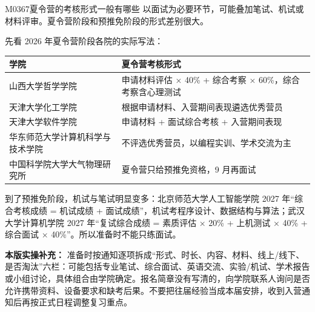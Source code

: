 \begin{qa}{M0367}{夏令营的考核形式一般有哪些}
以面试为必要环节，可能叠加笔试、机试或材料评审。夏令营阶段和预推免阶段的形式差别很大。

先看 2026 年夏令营阶段各院的实际写法：
\par\vspace{2pt}\nobreak\begin{center}\footnotesize
\begin{tabularx}{\textwidth}{>{\raggedright\arraybackslash}X>{\raggedright\arraybackslash}X}
\toprule
\textbf{学院} & \textbf{夏令营考核形式} \\ \midrule
山西大学哲学学院 & 申请材料评估 × 40\% + 综合考察 × 60\%，综合考察含心理测试 \\
天津大学化工学院 & 根据申请材料、入营期间表现遴选优秀营员 \\
天津大学软件学院 & 申请材料 + 面试综合考核 + 入营期间表现 \\
华东师范大学计算机科学与技术学院 & 不评选优秀营员，以编程实训、学术交流为主 \\
中国科学院大学大气物理研究所 & 夏令营只给预推免资格，9 月再面试 \\
\bottomrule
\end{tabularx}
\end{center}\vspace{2pt}\par

到了预推免阶段，机试与笔试明显变多：北京师范大学人工智能学院 2027 年“综合考核成绩 = 机试成绩 + 面试成绩”，机试考程序设计、数据结构与算法；武汉大学计算机学院 2027 年“复试综合成绩 = 素质评估 × 20\% + 上机测试 × 40\% + 综合面试 × 40\%”。所以准备时不能只练面试。
\par\textbf{本版实操补充：} 准备时按通知逐项拆成“形式、时长、内容、材料、线上/线下、是否淘汰”六栏：可能包括专业笔试、综合面试、英语交流、实验/机试、学术报告或小组讨论，具体组合由学院确定。报名简章没有写清的，向学院联系人询问是否允许携带资料、设备要求和缺考后果。不要把往届经验当成本届安排，收到入营通知后再按正式日程调整复习重点。
\end{qa}

